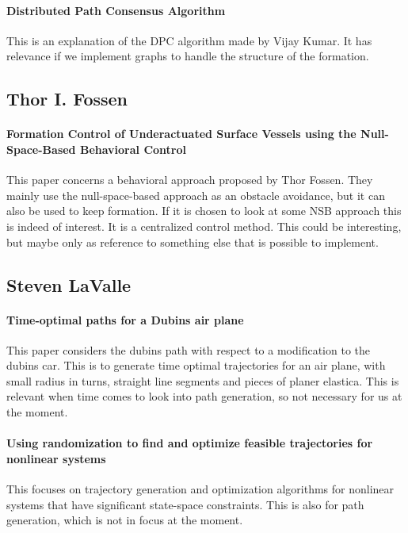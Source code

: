 \paragraph{Distributed Path Consensus Algorithm}
This is an explanation of the DPC algorithm made by Vijay Kumar. It has relevance if we implement graphs to handle the structure of the formation. \citep{bhattacharya2010distributed}

\subsection{Thor I. Fossen}

\paragraph{Formation Control of Underactuated Surface Vessels using the Null-Space-Based Behavioral Control}
This paper concerns a behavioral approach proposed by Thor Fossen. They mainly use the null-space-based approach as an obstacle avoidance, but it can also be used to keep formation. If it is chosen to look at some NSB approach this is indeed of interest. It is a centralized control method. This could be interesting, but maybe only as reference to something else that is possible to implement. \citep{arrichiello2006formation}

\subsection{Steven LaValle}

\paragraph{Time-optimal paths for a Dubins air plane}
This paper considers the dubins path with respect to a modification to the dubins car. This is to generate time optimal trajectories for an air plane, with small radius in turns, straight line segments and pieces of planer elastica.
This is relevant when time comes to look into path generation, so not necessary for us at the moment.

{\vskip0pt\color{gray}
\paragraph{Using randomization to find and optimize feasible trajectories for nonlinear systems}
This focuses on trajectory generation and optimization algorithms for nonlinear systems that have significant state-space constraints.
This is also for path generation, which is not in focus at the moment.}

